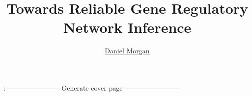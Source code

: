 \documentclass[twoside,11pt]{Latex/Classes/PhDthesisSU} %
\title{Towards Reliable Gene Regulatory Network Inference}%
\subtitle{}%
\author{\href{mailto:daniel.morgan@dbb.su.se}{Daniel Morgan}}
\begin{document}

\frontmatterSU


: ----------------------- Generate cover page ------------------------




\thispagestyle{empty}


\phantom{.}


 










\setcounter{secnumdepth}{2} %
\setcounter{tocdepth}{2}    %
\tableofcontents            %
\end{document}
